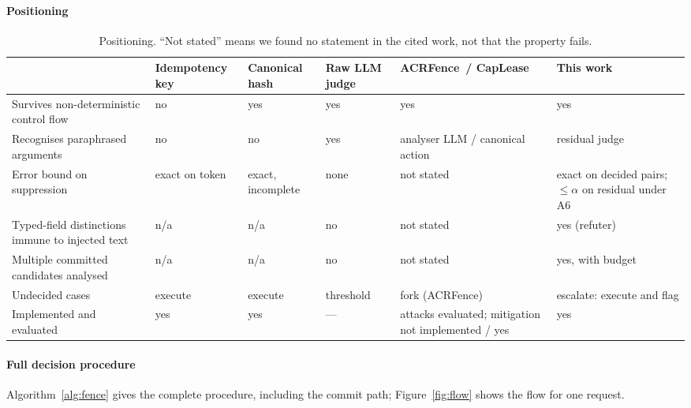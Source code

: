 \paragraph{Positioning}


\begin{table}[!tbp]
\centering\scriptsize\setlength{\tabcolsep}{3.5pt}
\caption{Positioning. ``Not stated'' means we found no statement in the cited work, not that the property fails.}\label{tab:positioning}
\begin{tabularx}{\linewidth}{@{}p{3.4cm}>{\raggedright\arraybackslash}X>{\raggedright\arraybackslash}X>{\raggedright\arraybackslash}X>{\raggedright\arraybackslash}X>{\raggedright\arraybackslash}X@{}}
\toprule
 & Idempotency key & Canonical hash & Raw LLM judge & ACRFence~/ CapLease & This work \\
\midrule
Survives non-deterministic control flow & no & yes & yes & yes & yes \\
Recognises paraphrased arguments & no & no & yes & analyser LLM / canonical action & residual judge \\
Error bound on suppression & exact on token & exact, incomplete & none & not stated & exact on decided pairs; $\le\alpha$ on residual under A6 \\
Typed-field distinctions immune to injected text & n/a & n/a & no & not stated & yes (refuter) \\
Multiple committed candidates analysed & n/a & n/a & no & not stated & yes, with budget \\
Undecided cases & execute & execute & threshold & fork (ACRFence) & escalate: execute and flag \\
Implemented and evaluated & yes & yes & --- & attacks evaluated; mitigation not implemented \citep{zheng2026acrfence} / yes & yes \\
\bottomrule
\end{tabularx}
\end{table}


\paragraph{Full decision procedure}
Algorithm~\ref{alg:fence} gives the complete procedure, including the commit path; Figure~\ref{fig:flow} shows the flow for one request.



